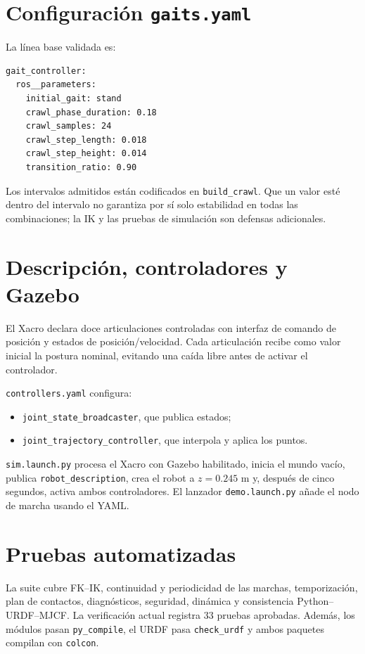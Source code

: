 \documentclass[11pt,a4paper]{article}
\begin{document}
\section{Configuración \texttt{gaits.yaml}}
La línea base validada es:
\begin{lstlisting}[style=yaml]
gait_controller:
  ros__parameters:
    initial_gait: stand
    crawl_phase_duration: 0.18
    crawl_samples: 24
    crawl_step_length: 0.018
    crawl_step_height: 0.014
    transition_ratio: 0.90
\end{lstlisting}
Los intervalos admitidos están codificados en \texttt{build\_crawl}. Que un
valor esté dentro del intervalo no garantiza por sí solo estabilidad en todas
las combinaciones; la IK y las pruebas de simulación son defensas adicionales.

\section{Descripción, controladores y Gazebo}
El Xacro declara doce articulaciones controladas con interfaz de comando de
posición y estados de posición/velocidad. Cada articulación recibe como valor
inicial la postura nominal, evitando una caída libre antes de activar el
controlador.

\texttt{controllers.yaml} configura:
\begin{itemize}
\item \texttt{joint\_state\_broadcaster}, que publica estados;
\item \texttt{joint\_trajectory\_controller}, que interpola y aplica los puntos.
\end{itemize}

\texttt{sim.launch.py} procesa el Xacro con Gazebo habilitado, inicia el mundo
vacío, publica \texttt{robot\_description}, crea el robot a $z=0.245$ m y,
después de cinco segundos, activa ambos controladores. El lanzador
\texttt{demo.launch.py} añade el nodo de marcha usando el YAML.

\section{Pruebas automatizadas}
La suite cubre FK--IK, continuidad y periodicidad de las marchas, temporización,
plan de contactos, diagnósticos, seguridad, dinámica y consistencia
Python--URDF--MJCF. La verificación actual registra 33 pruebas aprobadas. Además, los
módulos pasan \texttt{py\_compile}, el URDF pasa \texttt{check\_urdf} y ambos
paquetes compilan con \texttt{colcon}.
\end{document}
